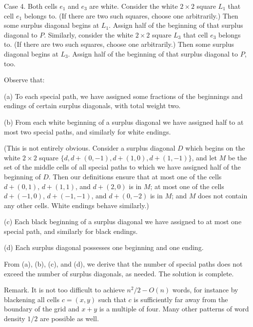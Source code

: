 \documentclass{article}
\begin{document}
Case 4. Both cells \(\displaystyle e_1\) and \(\displaystyle e_3\) are white. Consider the white \(\displaystyle 2 \times 2\) square \(\displaystyle L_1\) that cell \(\displaystyle e_1\) belongs to. (If there are two such squares, choose one arbitrarily.) Then some surplus diagonal begins at \(\displaystyle L_1\). Assign half of the beginning of that surplus diagonal to \(\displaystyle P\). Similarly, consider the white \(\displaystyle 2 \times 2\) square \(\displaystyle L_3\) that cell \(\displaystyle e_3\) belongs to. (If there are two such squares, choose one arbitrarily.) Then some surplus diagonal begins at \(\displaystyle L_3\). Assign half of the beginning of that surplus diagonal to \(\displaystyle P\), too.

Observe that:

(a) To each special path, we have assigned some fractions of the beginnings and endings of certain surplus diagonals, with total weight two.

(b) From each white beginning of a surplus diagonal we have assigned half to at most two special paths, and similarly for white endings.

(This is not entirely obvious. Consider a surplus diagonal \(\displaystyle D\) which begins on the white \(\displaystyle 2 \times 2\) square \(\displaystyle \{d, d + (0, -1), d + (1, 0), d + (1, -1)\}\), and let \(\displaystyle M\) be the set of the middle cells of all special paths to which we have assigned half of the beginning of \(\displaystyle D\). Then our definitions ensure that at most one of the cells \(\displaystyle d + (0, 1)\), \(\displaystyle d + (1, 1)\), and \(\displaystyle d + (2, 0)\) is in \(\displaystyle M\); at most one of the cells \(\displaystyle d + (-1, 0)\), \(\displaystyle d + (-1, -1)\), and \(\displaystyle d + (0, -2)\) is in \(\displaystyle M\); and \(\displaystyle M\) does not contain any other cells. White endings behave similarly.)

(c) Each black beginning of a surplus diagonal we have assigned to at most one special path, and similarly for black endings.

(d) Each surplus diagonal possesses one beginning and one ending.

From (a), (b), (c), and (d), we derive that the number of special paths does not exceed the number of surplus diagonals, as needed. The solution is complete.

Remark. It is not too difficult to achieve \(\displaystyle n^2/2 - O(n)\) words, for instance by blackening all cells \(\displaystyle c = (x, y)\) such that \(\displaystyle c\) is sufficiently far away from the boundary of the grid and \(\displaystyle x + y\) is a multiple of four. Many other patterns of word density \(\displaystyle 1/2\) are possible as well.
\end{document}
